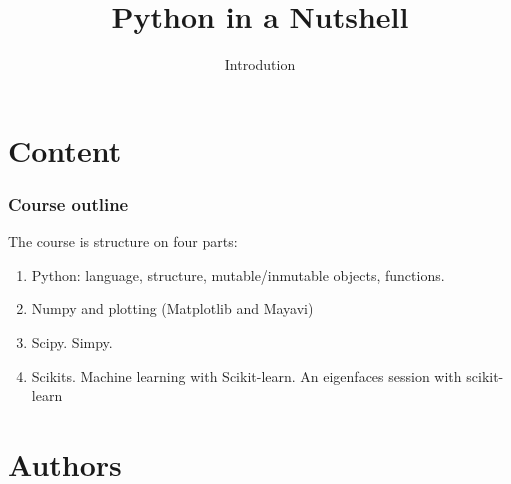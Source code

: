 \documentclass[9pt,colorlinks]{beamer}
\title{ Python in a Nutshell}
\subtitle
 {Introdution } %
\begin{document}
\begin{frame}[plain]
   \maketitle
\end{frame}


\section{Content}


\begin{frame}
	\frametitle{ Course outline}
The course is structure on four parts:
\begin{enumerate}
    \item Python: language, structure, mutable/inmutable objects, functions.
     \item Numpy and plotting (Matplotlib and Mayavi)
     \item Scipy. Simpy.
     \item Scikits. Machine learning with Scikit-learn. An eigenfaces session with scikit-learn 
\end{enumerate}

\end{frame}
\section{Authors} %
\label{sec:Authors}
\end{document}
